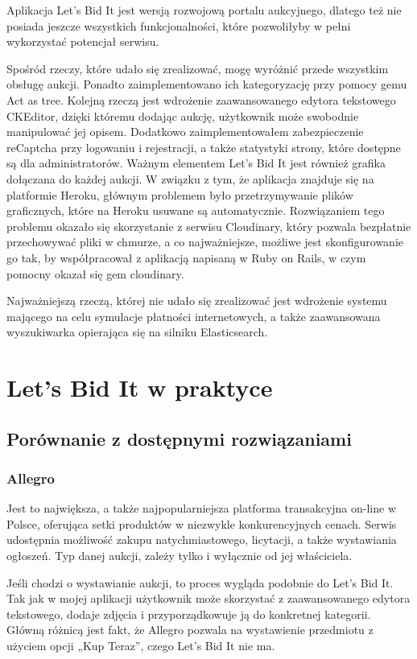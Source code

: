 \documentclass[brudnopis]{xmgr}
\begin{document}
Aplikacja Let's Bid It jest wersją rozwojową portalu aukcyjnego, dlatego też nie posiada jeszcze wszystkich funkcjonalności, które pozwoliłyby w pełni wykorzystać potencjał serwisu.

Spośród rzeczy, które udało się zrealizować, mogę wyróżnić przede wszystkim obsługę aukcji. Ponadto zaimplementowano ich kategoryzację przy pomocy gemu Act as tree. Kolejną rzeczą jest wdrożenie zaawansowanego edytora tekstowego CKEditor, dzięki któremu dodając aukcję, użytkownik może swobodnie manipulować jej opisem. Dodatkowo zaimplementowałem zabezpieczenie reCaptcha przy logowaniu i rejestracji, a także statystyki strony, które dostępne są dla administratorów. Ważnym elementem Let's Bid It jest również grafika dołączana do każdej aukcji. W związku z tym, że aplikacja znajduje się na platformie Heroku, głównym problemem było przetrzymywanie plików graficznych, które na Heroku usuwane są automatycznie. Rozwiązaniem tego problemu okazało się skorzystanie z serwisu Cloudinary, który pozwala bezpłatnie przechowywać pliki w chmurze, a co najważniejsze, możliwe jest skonfigurowanie go tak, by współpracował z aplikacją napisaną w Ruby on Rails, w czym pomocny okazał się gem cloudinary.

Najważniejszą rzeczą, której nie udało się zrealizować jest wdrożenie systemu mającego na celu symulacje płatności internetowych, a także zaawansowana wyszukiwarka opierająca się na silniku Elasticsearch.


\chapter{Let's Bid It w praktyce}

\section{Porównanie z dostępnymi rozwiązaniami}

\subsection{Allegro} 

Jest to największa, a także najpopularniejsza platforma transakcyjna on-line w Polsce, oferująca setki produktów w niezwykle konkurencyjnych cenach. Serwis udostępnia możliwość zakupu natychmiastowego, licytacji, a także wystawiania ogłoszeń. Typ danej aukcji, zależy tylko i wyłącznie od jej właściciela.

Jeśli chodzi o wystawianie aukcji, to proces wygląda podobnie do Let's Bid It. Tak jak w mojej aplikacji użytkownik może skorzystać z zaawansowanego edytora tekstowego, dodaje zdjęcia i przyporządkowuje ją do konkretnej kategorii. Główną różnicą jest fakt, że Allegro pozwala na wystawienie przedmiotu z użyciem opcji „Kup Teraz”, czego Let's Bid It nie ma.
\end{document}
